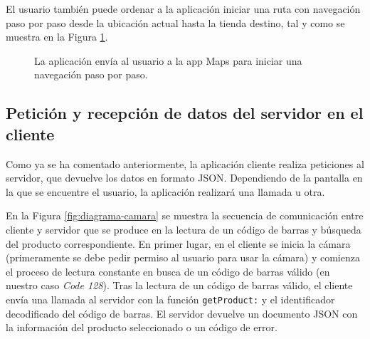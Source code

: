 El usuario también puede ordenar a la aplicación iniciar una ruta con navegación paso por paso desde la ubicación actual hasta la tienda destino, tal y como se muestra en la Figura \ref{fig:mapa-ruta}.

\begin{figure}[H]
	\centering
	\caption{La aplicación envía al usuario a la app Maps para iniciar una navegación paso por paso.}
	\label{fig:mapa-ruta}
\end{figure}

\subsection{Petición y recepción de datos del servidor en el cliente}
Como ya se ha comentado anteriormente, la aplicación cliente realiza peticiones al servidor, que devuelve los datos en formato JSON. Dependiendo de la pantalla en la que se encuentre el usuario, la aplicación realizará una llamada u otra.

En la Figura \ref{fig:diagrama-camara} se muestra la secuencia de comunicación entre cliente y servidor que se produce en la lectura de un código de barras y búsqueda del producto correspondiente. En primer lugar, en el cliente se inicia la cámara (primeramente se debe pedir permiso al usuario para usar la cámara) y comienza el proceso de lectura constante en busca de un código de barras válido (en nuestro caso \emph{Code 128}). Tras la lectura de un código de barras válido, el cliente envía una llamada al servidor con la función \texttt{getProduct:} y el identificador decodificado del código de barras. El servidor devuelve un documento JSON con la información del producto seleccionado o un código de error.

